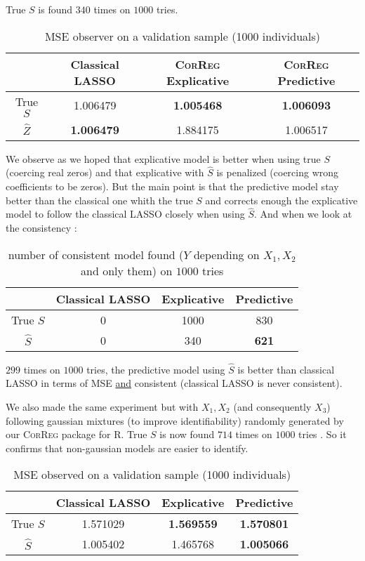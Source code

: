 \documentclass[12pt,a4paper]{report}
\begin{document}
		True $S$ is found $340$ times on $1000$ tries.
		
		\begin{table}[h!]
		\centering
		\begin{tabular}{|c|c|c|c|}
		\hline 
		 & Classical LASSO & \textsc{CorReg} Explicative & \textsc{CorReg} Predictive \\ 
		\hline 
		True $S$ &  1.006479 & \textbf{1.005468} & \textbf{1.006093} \\ 
		\hline 
		$\hat{Z}$ & \textbf{1.006479} & 1.884175 & 1.006517 \\ 
		\hline 
		\end{tabular} 
		\caption{MSE observer on a validation sample (1000 individuals)}
		\end{table}

		We observe as we hoped that explicative model is better when using true $S$ (coercing real zeros) and that explicative with $\hat{S}$ is penalized (coercing wrong coefficients to be zeros).
		But the main point is that the predictive model stay better than the classical one whith the true $S$ and corrects enough the explicative model to follow the classical LASSO closely when using $\hat{S}$. 
		And when we look at the consistency :
		\begin{table}[h!]	
		\centering
		\begin{tabular}{|c|c|c|c|}
		\hline 
		 & Classical LASSO & Explicative & Predictive \\ 
		\hline 
		True $S$ &  0 & 1000 & 830 \\ 
		\hline 
		$\hat{S}$ & 0 & 340 & \textbf{621} \\ 
		\hline 
		\end{tabular} 
		\caption{number of consistent model found ($Y$ depending on $X_1,X_2$ and only them) on $1000$ tries}
		\end{table}				
		
		$299$ times on $1000$ tries, the predictive model using $\hat{S}$ is better than classical LASSO in terms of MSE \underline{and} consistent (classical LASSO is never consistent).
		
		We also made the same experiment but with $X_1,X_2$ (and consequently $X_3$) following gaussian mixtures (to improve identifiability) randomly generated by our \textsc{CorReg} package for R. 
		True $S$ is now found $714$ times on $1000$ tries \label{testidentifiable}. So it confirms that non-gaussian models are easier to identify.
		
		
		\begin{table}[h!]
		\centering
		\begin{tabular}{|c|c|c|c|}
		\hline 
		 & Classical LASSO & Explicative & Predictive \\ 
		\hline 
		True $S$ &  1.571029 & \textbf{1.569559} & \textbf{1.570801} \\ 
		\hline 
		$\hat{S}$ & 1.005402 & 1.465768 & \textbf{1.005066} \\ 
		\hline 
		\end{tabular} 
		\caption{MSE observed on a validation sample (1000 individuals)}
		\end{table}
\end{document}
